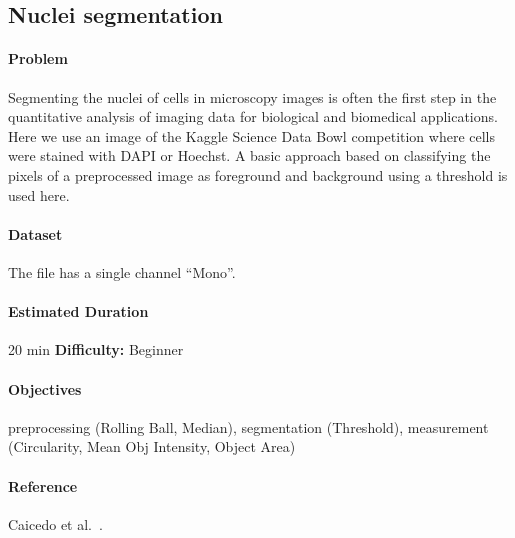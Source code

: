 \subsection{Nuclei segmentation} \label{sec:nuclei-segmentation}

\paragraph{Problem} Segmenting the nuclei of cells in microscopy images is often the first step in the quantitative analysis of imaging data for biological and biomedical applications. Here we use an image of the Kaggle Science Data Bowl competition where cells were stained with DAPI or Hoechst. A basic approach based on classifying the pixels of a preprocessed image as foreground and background using a threshold is used here.

\paragraph{Dataset} The file  has a single channel ``Mono''.

\paragraph{Estimated Duration} 20 min \quad \textbf{Difficulty:} Beginner

\paragraph{Objectives} preprocessing (Rolling Ball, Median), segmentation (Threshold), measurement (Circularity, Mean Obj Intensity, Object Area)

\paragraph{Reference} Caicedo et al.~\cite{caicedo2019}.

